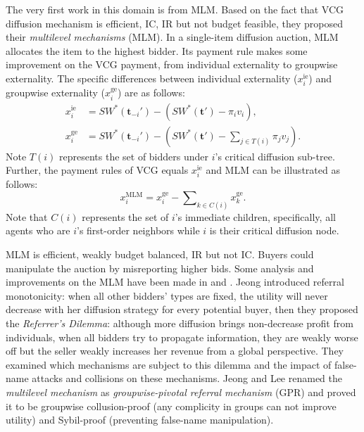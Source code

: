\documentclass{article}
\begin{document}
The very first work in this domain is from MLM\cite{lee2017mechanisms}. Based on the fact that VCG diffusion mechanism is efficient, IC, IR but not budget feasible, they proposed their \textit{multilevel mechanisms} (MLM). In a single-item diffusion auction, MLM allocates the item to the highest bidder. Its payment rule makes some improvement on the VCG payment, from individual externality to groupwise externality. The specific differences between individual externality ($x^{\text{ie}}_i$) and groupwise externality ($x^{\text{ge}}_i$) are as follows:
\[
    \begin{split}
        x_i^{\text{ie}} &= SW^\ast(\mathbf{t}_{-i}')-(SW^\ast(\mathbf{t}')-\pi_iv_i),\\
        x_i^{\text{ge}} &= SW^\ast(\mathbf{t}_{-i}')-(SW^\ast(\mathbf{t}')-\sum \nolimits_{j\in T(i)}\pi_j v_j).
    \end{split}
\]
Note $T(i)$ represents the set of bidders under $i$'s critical diffusion sub-tree. Further, the payment rules of VCG equals $x_i^{\text{ie}}$ and MLM can be illustrated as follows:
\[
    x_i^{\text{MLM}} = x_i^{\text{ge}} - \sum \nolimits_{k\in C(i)}  x_k^{\text{ge}}.
\]
Note that $C(i)$ represents the set of $i$'s immediate children, specifically, all agents who are $i$'s first-order neighbors while $i$ is their critical diffusion node.

MLM is efficient, weakly budget balanced, IR but not IC. Buyers could manipulate the auction by misreporting higher bids. Some analysis and improvements on the MLM have been made in \cite{jeong2020referrer} and \cite{jeong2020groupwise}. Jeong  introduced referral monotonicity: when all other bidders' types are fixed, the utility will never decrease with her diffusion strategy for every potential buyer, then they proposed the \textit{Referrer's Dilemma}: although more diffusion brings non-decrease profit from individuals, when all bidders try to propagate information, they are weakly worse off but the seller weakly increases her revenue from a global perspective. They examined which mechanisms are subject to this dilemma and the impact of false-name attacks and collisions on these mechanisms. Jeong and Lee  renamed the \textit{multilevel mechanism} as \textit{groupwise-pivotal referral mechanism} (GPR) and proved it to be groupwise collusion-proof (any complicity in groups can not improve utility) and Sybil-proof (preventing false-name manipulation).
\end{document}
